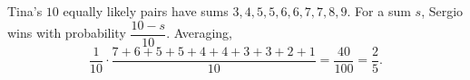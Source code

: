 Tina's $10$ equally likely pairs have sums $3,4,5,5,6,6,7,7,8,9$. For a sum $s$, Sergio wins with probability $\dfrac{10-s}{10}$. Averaging,
\[\dfrac{1}{10}\cdot\dfrac{7+6+5+5+4+4+3+3+2+1}{10}=\dfrac{40}{100}=\boxed{\dfrac{2}{5}}.\]
